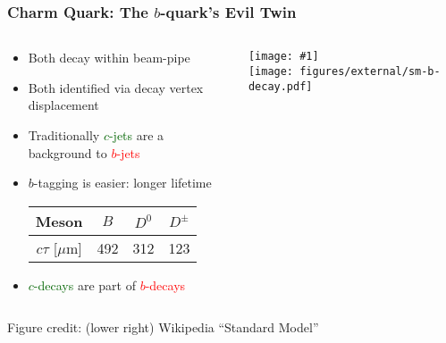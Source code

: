\documentclass[usenames,dvipsnames]{beamer}
\newcommand{\widegraphic}[1]{\texttt{[image: \#1]}}
\begin{document}
\begin{frame}
  \frametitle{Charm Quark: The $b$-quark's {Evil} Twin}
  \begin{columns}
    \begin{column}{0.5\textwidth}
      \begin{itemize}
        \item Both decay within beam-pipe
        \item Both identified via decay vertex displacement
        \item Traditionally \textcolor{darkgreen}{$c$-jets} are a background to \textcolor{red}{$b$-jets}
        \item $b$-tagging is easier: longer lifetime\\
        \begin{center}
          \begin{tabular}{c | c c c}
            Meson  &  $B$ & $D^0$ & $D^{\pm}$ \\ \hline
            $c\tau$ [$\mu$m] & 492 & 312 & 123 \\
          \end{tabular}
        \end{center}
      \item \textcolor{darkgreen}{$c$-decays} are part of \textcolor{red}{$b$-decays}
      \end{itemize}
    \end{column}
    \begin{column}{0.4\textwidth}
      \begin{center}
      \widegraphic{figures/external/b-jet.pdf}\\[0.1cm]
      \texttt{[image: figures/external/sm-b-decay.pdf]}
      \end{center}
    \end{column}
  \end{columns}
  \begin{tiny}
    Figure credit: (lower right) Wikipedia ``Standard Model''
  \end{tiny}
\end{frame}
\end{document}
